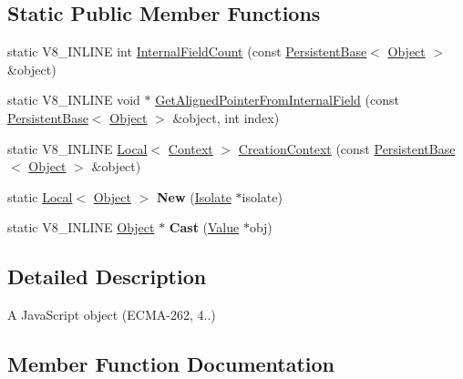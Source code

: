 \subsection*{Static Public Member Functions}
\begin{DoxyCompactItemize}
\item 
static V8\+\_\+\+I\+N\+L\+I\+NE int \mbox{\hyperlink{classv8_1_1Object_a324a71142f621a32bfe5738648718370}{Internal\+Field\+Count}} (const \mbox{\hyperlink{classv8_1_1PersistentBase}{Persistent\+Base}}$<$ \mbox{\hyperlink{classv8_1_1Object}{Object}} $>$ \&object)
\item 
static V8\+\_\+\+I\+N\+L\+I\+NE void $\ast$ \mbox{\hyperlink{classv8_1_1Object_a65b5a3dc93c0774594f8b0f2ab5481c8}{Get\+Aligned\+Pointer\+From\+Internal\+Field}} (const \mbox{\hyperlink{classv8_1_1PersistentBase}{Persistent\+Base}}$<$ \mbox{\hyperlink{classv8_1_1Object}{Object}} $>$ \&object, int index)
\item 
static V8\+\_\+\+I\+N\+L\+I\+NE \mbox{\hyperlink{classv8_1_1Local}{Local}}$<$ \mbox{\hyperlink{classv8_1_1Context}{Context}} $>$ \mbox{\hyperlink{classv8_1_1Object_ae958203f358c7af3727ef7179790d01f}{Creation\+Context}} (const \mbox{\hyperlink{classv8_1_1PersistentBase}{Persistent\+Base}}$<$ \mbox{\hyperlink{classv8_1_1Object}{Object}} $>$ \&object)
\item 
\mbox{\label{classv8_1_1Object_a0c397b055e2f5050c6ffc33970669c4d}} 
static \mbox{\hyperlink{classv8_1_1Local}{Local}}$<$ \mbox{\hyperlink{classv8_1_1Object}{Object}} $>$ {\bfseries New} (\mbox{\hyperlink{classv8_1_1Isolate}{Isolate}} $\ast$isolate)
\item 
\mbox{\label{classv8_1_1Object_a1f9ac46d0b164197318ce81dc0ec1343}} 
static V8\+\_\+\+I\+N\+L\+I\+NE \mbox{\hyperlink{classv8_1_1Object}{Object}} $\ast$ {\bfseries Cast} (\mbox{\hyperlink{classv8_1_1Value}{Value}} $\ast$obj)
\end{DoxyCompactItemize}


\subsection{Detailed Description}
A Java\+Script object (E\+C\+M\+A-\/262, 4..) 

\subsection{Member Function Documentation}
\mbox{\label{classv8_1_1Object_a10dcefb0bd595a959234703690a02530}} 
